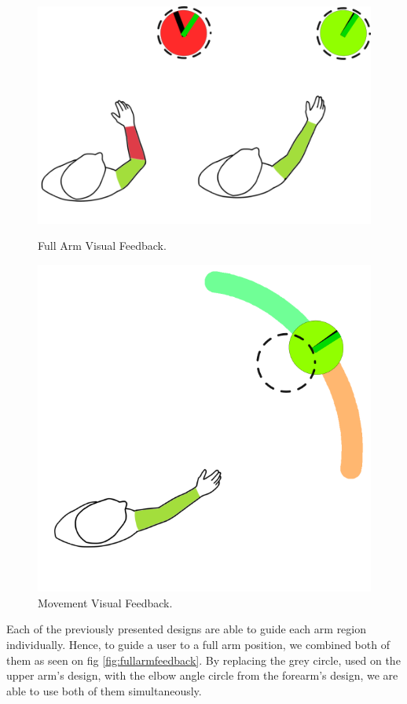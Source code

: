 \begin{figure}[!t]
  \centering
  \includegraphics[width=0.8\linewidth]{imgs/approach/fullarmfeedback}
    \caption{Full Arm Visual Feedback.}
    \label{fig:fullarmfeedback}
    \endminipage\hfill
{}
  \centering
  \includegraphics[width=0.8\linewidth]{imgs/approach/movementguidancefeedback}
    \caption{Movement Visual Feedback.}
    \label{fig:movementguidancefeedback}
    \endminipage
\end{figure}

Each of the previously presented designs are able to guide each arm region individually.
Hence, to guide a user to a full arm position, we combined both of them as seen on fig \ref{fig:fullarmfeedback}. 
By replacing the grey circle, used on the upper arm's design, with the elbow angle circle from the forearm's design, we are able to use both of them simultaneously. 

